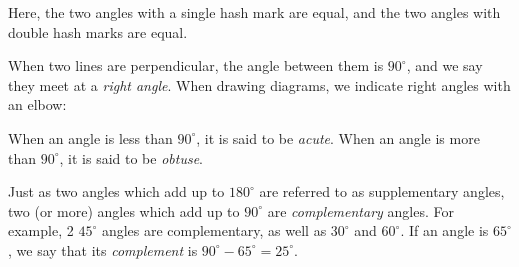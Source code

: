 Here, the two angles with a single hash mark are equal, and the two angles with 
double hash marks are equal.

When two lines are perpendicular, the angle between them is $90^\circ$, and we 
say they meet at a \emph{right angle}. When drawing diagrams, we indicate right
angles with an elbow:

\begin{center}
\end{center}

 
When an angle is less than $90^\circ$, it is said to be
\emph{acute}. When an angle is more than $90^\circ$, it is said to be
\emph{obtuse}.

Just as two angles which add up to $180^\circ$ are referred to as supplementary angles,
two (or more) angles which add up to $90^\circ$ are \emph{complementary} angles. For example, 2 $45^\circ$ angles are complementary, as well as $30^\circ$ and $60^\circ$. If an angle is $65^\circ$, we say that its \emph{complement} is $90^\circ-65^\circ=25^\circ$.

\begin{center}
\hspace{2cm}
\end{center}


